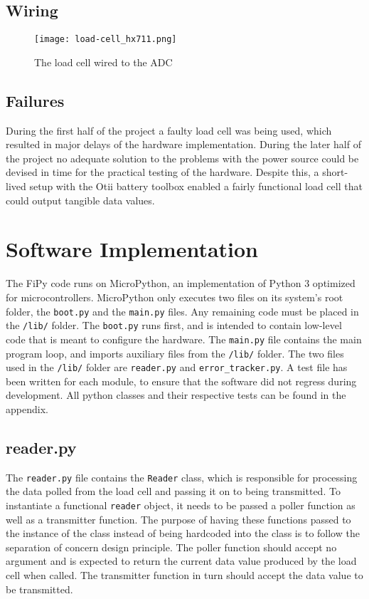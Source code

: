 \subsection{Wiring}
\begin{figure}[h]
	\centering
	\texttt{[image: load-cell\_hx711.png]}
	\caption{The load cell wired to the ADC}
	\label{fig:load-cell_hx711}
\end{figure}

\subsection{Failures}
During the first half of the project a faulty load cell was being used, which resulted in major delays of the hardware implementation. During the later half of the project no adequate solution to the problems with the power source could be devised in time for the practical testing of the hardware. Despite this, a short-lived setup with the Otii battery toolbox enabled a fairly functional load cell that could output tangible data values.



\section{Software Implementation}
The FiPy code runs on MicroPython, an implementation of Python 3 optimized for microcontrollers. MicroPython only executes two files on its system's root folder, the \lstinline{boot.py} and the \lstinline{main.py} files. Any remaining code must be placed in the \lstinline{/lib/} folder. The \lstinline{boot.py} runs first, and is intended to contain low-level code that is meant to configure the hardware. The \lstinline{main.py} file contains the main program loop, and imports auxiliary files from the \lstinline{/lib/} folder.
The two files used in the \lstinline{/lib/} folder are \lstinline{reader.py} and \lstinline{error_tracker.py}. A test file has been written for each module, to ensure that the software did not regress during development. All python classes and their respective tests can be found in the appendix. 

\subsection{reader.py}
The \lstinline{reader.py} file contains the \lstinline{Reader} class, which is responsible for processing the data polled from the load cell and passing it on to being transmitted. To instantiate a functional \lstinline{reader} object, it needs to be passed a poller function as well as a transmitter function. The purpose of having these functions passed to the instance of the class instead of being hardcoded into the class is to follow the separation of concern design principle.\cite{sep-concern} The poller function should accept no argument and is expected to return the current data value produced by the load cell when called. The transmitter function in turn should accept the data value to be transmitted.

